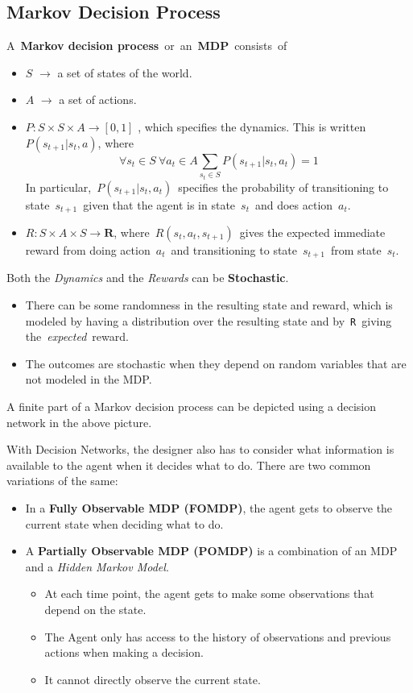 \subsection{Markov Decision Process}
A \textbf{Markov decision process} or an \textbf{MDP} consists of
\begin{itemize}[leftmargin=*]
    \item   $S$ $\rightarrow$ a set of states of the world.
    \item   $A$ $\rightarrow$ a set of actions.
    \item   $P:S\times S\times A \rightarrow [0,1]$ , which specifies the dynamics. This is written $P(s_{t+1}|s_{t},a)$, where
    $$
    \forall s_t \in S \ \forall a_t \in A \sum_{s_{t} \in S} P(s_{t+1}|s_{t},a_{t}) = 1
    $$
        In particular, $P(s_{t+1}|s_t,a_t)$ specifies the probability of transitioning to state $s_{t+1}$ given that the agent is in state $s_t$ and does action $a_t$.
    \item  $R:S \times A \times S \rightarrow \textbf{R}$, where $R(s_t,a_t,s_{t+1})$ gives the expected immediate reward from doing action $a_t$ and transitioning to state $s_{t+1}$ from state $s_t$.
\end{itemize}

Both the \textit{Dynamics} and the \textit{Rewards} can be \textbf{Stochastic}.
\begin{itemize}[leftmargin=*]
    \item There can be some randomness in the resulting state and reward, which is modeled by having a distribution over the resulting state and by \texttt{R} giving the \textit{expected} reward.
    \item The outcomes are stochastic when they depend on random variables that are not modeled in the MDP.
\end{itemize}
A finite part of a Markov decision process can be depicted using a decision network in the above picture.

With Decision Networks, the designer also has to consider what information is available to the agent when it decides what to do.
There are two common variations of the same:
\begin{itemize}[leftmargin=*]
    \item In a \textbf{Fully Observable MDP (FOMDP)}, the agent gets to observe the current state when deciding what to do.
    \item A \textbf{Partially Observable MDP (POMDP)} is a combination of an MDP and a \textit{Hidden Markov Model}.
    \begin{itemize}
        \item At each time point, the agent gets to make some observations that depend on the state.
        \item The Agent only has access to the history of observations and previous actions when making a decision.
        \item It cannot directly observe the current state.
    \end{itemize}
\end{itemize}

